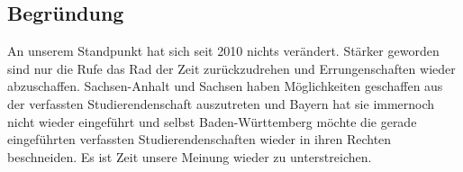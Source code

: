 \documentclass[draft,10pt,oneside]{scrartcl}
\begin{document}
\subsection*{Begründung}

An unserem Standpunkt hat sich seit 2010 nichts verändert. Stärker geworden sind
nur die Rufe das Rad der Zeit zurückzudrehen und Errungenschaften wieder
abzuschaffen. Sachsen-Anhalt und Sachsen haben Möglichkeiten geschaffen aus der
verfassten Studierendenschaft auszutreten und Bayern hat sie immernoch nicht
wieder eingeführt und selbst Baden-Württemberg möchte die gerade eingeführten
verfassten Studierendenschaften wieder in ihren Rechten beschneiden. Es ist Zeit
unsere Meinung wieder zu unterstreichen.
\end{document}
